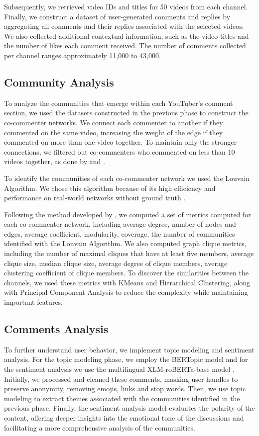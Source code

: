 \documentclass[sigconf]{acmart}
\begin{document}
Subsequently, we retrieved video IDs and titles for 50 videos from each channel. 
Finally, we construct a dataset of user-generated comments and replies by aggregating all comments 
and their replies associated with the selected videos. We also collected additional contextual information, such as 
the video titles and the number of likes each comment received. 
The number of comments collected per channel ranges approximately 11,000 to 43,000.

\subsection{Community Analysis}

To analyze the communities that emerge within each YouTuber's comment section, we used the datasets constructed 
in the previous phase to construct the co-commenter networks. We connect each commenter to
another if they commented on the same video, increasing the weight of the edge if they commented
on more than one video together. To maintain only the stronger connections, we filtered out co-commenters
who commented on less than 10 videos together, as done by \cite{shajari2023} and \cite{kirdemir2023}. 

To identify the communities of each co-commenter network we used the Louvain Algorithm. We chose this 
algorithm because of its high efficiency and performance on real-world networks
without ground truth \cite{YOU2020104822}.

Following the method developed by \cite{kirdemir2023}, we computed a set of metrics computed 
for each co-commenter network, including average degree, number of nodes and edges, average coefficient,
modularity, coverage, the number of communities identified with the Louvain Algorithm. We also computed graph clique 
metrics, including the number of maximal cliques that have at least five members, 
average clique size, median clique size, average degree of clique members, average clustering coefficient
of clique members. To discover the similarities between the channels, we used these metrics 
with KMeans and Hierarchical Clustering, along with Principal Component Analysis to reduce the complexity
while maintaining important features.

\subsection{Comments Analysis}

To further understand user behavior, we implement
topic modeling and sentiment analysis. For the topic modeling phase, we employ the BERTopic model 
\cite{bertopic2022} and for the sentiment analysis we use the multilingual 
XLM-roBERTa-base model \cite{barbieri-etal-2022-xlm}. 
Initially, we  processed and cleaned these comments, masking user handles to preserve anonymity,
removing emojis, links and stop words.
Then, we use topic modeling to extract themes associated with the communities identified in the 
previous phase. Finally, the sentiment analysis model evaluates the polarity of the content, 
offering deeper insights into the emotional tone of the discussions and facilitating a more 
comprehensive analysis of the communities.
\end{document}
